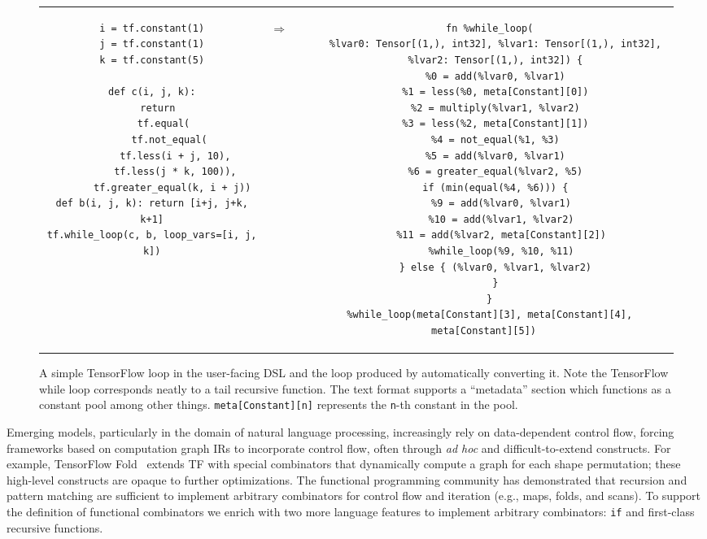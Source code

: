 \begin{figure*}[htb!]
  \begin{tabular}{ccc}
  \begin{minipage}{0.4\textwidth}
  \begin{verbatim}
i = tf.constant(1)
j = tf.constant(1)
k = tf.constant(5)

def c(i, j, k):
  return
    tf.equal(
      tf.not_equal(
        tf.less(i + j, 10),
        tf.less(j * k, 100)),
       tf.greater_equal(k, i + j))
def b(i, j, k): return [i+j, j+k, k+1]
tf.while_loop(c, b, loop_vars=[i, j, k])
  \end{verbatim}
  \end{minipage}
& \hspace{-2.0em}
\begin{Huge}
  $\Rightarrow$
\end{Huge}
&
  \begin{minipage}{0.5\textwidth}
  \begin{verbatim}
  fn %while_loop(
    %lvar0: Tensor[(1,), int32], %lvar1: Tensor[(1,), int32],
    %lvar2: Tensor[(1,), int32]) {
    %0 = add(%lvar0, %lvar1)
    %1 = less(%0, meta[Constant][0])
    %2 = multiply(%lvar1, %lvar2)
    %3 = less(%2, meta[Constant][1])
    %4 = not_equal(%1, %3)
    %5 = add(%lvar0, %lvar1)
    %6 = greater_equal(%lvar2, %5)
    if (min(equal(%4, %6))) {
      %9 = add(%lvar0, %lvar1)
      %10 = add(%lvar1, %lvar2)
      %11 = add(%lvar2, meta[Constant][2])
      %while_loop(%9, %10, %11)
    } else { (%lvar0, %lvar1, %lvar2)
    }
  }
  %while_loop(meta[Constant][3], meta[Constant][4], meta[Constant][5])
  \end{verbatim}
  \end{minipage}
  \end{tabular}
  \caption{\textmd{
    A simple TensorFlow loop in the user-facing DSL and the \relay
      loop produced by automatically converting it.
    Note the TensorFlow while loop corresponds neatly to a tail recursive
      function.
    The \relay text format supports a ``metadata'' section which functions
      as a constant pool among other things.
    \texttt{meta[Constant][n]} represents the \texttt{n}-th constant in the
      pool.
  }}
  \label{fig:tf_to_relay_loop}
  \end{figure*}

Emerging models, particularly in the domain of natural language processing, increasingly
  rely on data-dependent control flow, forcing frameworks based on computation graph IRs
  to incorporate control flow, often through \textit{ad hoc} and difficult-to-extend constructs.
For example, TensorFlow Fold~\cite{tf_fold} extends TF with special combinators that
  dynamically compute a graph for each shape permutation;
  these high-level constructs are opaque to further optimizations.
The functional programming community has demonstrated that recursion and pattern matching are sufficient
  to implement arbitrary combinators for control flow and iteration (e.g., maps, folds, and scans).
To support the definition of functional combinators
  we enrich \relay with two more language
  features to implement arbitrary combinators: \verb|if| and first-class recursive functions.

